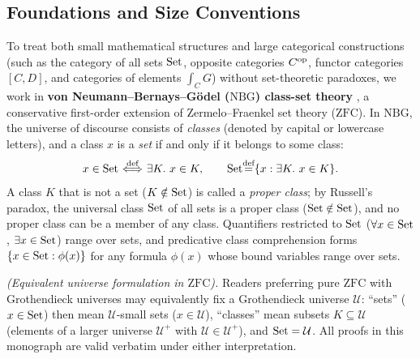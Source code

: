 \documentclass[10pt,a4paper]{article}
\begin{document}
\subsection{Foundations and Size Conventions}\label{sec:foundations}
To treat both small mathematical structures and large categorical constructions (such as the category of all sets ${\textrm{Set}}$, opposite categories $C^{\textrm{op}}$, functor categories $[C, D]$, and categories of elements $\int_C G$) without set-theoretic paradoxes, we work in \textbf{von Neumann--Bernays--G\"odel ($\mathrm{NBG}$) class-set theory} \cite{Godel1940,Bernays1958,Mendelson2015,TakeutiZaring1982}, a conservative first-order extension of Zermelo--Fraenkel set theory ($\mathrm{ZFC}$). In $\mathrm{NBG}$, the universe of discourse consists of \emph{classes} (denoted by capital or lowercase letters), and a class $x$ is a \emph{set} if and only if it belongs to some class:
$$x \in {\textrm{Set}} {\stackrel{{\textrm{def}}}{\ \Longleftrightarrow\ }} \exists K.\ x \in K, \qquad {\textrm{Set}} {\stackrel{{\textrm{def}}}{=}} \{x : \exists K.\ x \in K\}.$$
A class $K$ that is not a set ($K \notin {\textrm{Set}}$) is called a \emph{proper class}; by Russell's paradox, the universal class ${\textrm{Set}}$ of all sets is a proper class (${\textrm{Set}} \notin {\textrm{Set}}$), and no proper class can be a member of any class. Quantifiers restricted to ${\textrm{Set}}$ ($\forall x \in {\textrm{Set}}$, $\exists x \in {\textrm{Set}}$) range over sets, and predicative class comprehension forms $\{x \in {\textrm{Set}} : \phi(x)\}$ for any formula $\phi(x)$ whose bound variables range over sets.

\emph{(Equivalent universe formulation in $\mathrm{ZFC}$).} Readers preferring pure $\mathrm{ZFC}$ with Grothendieck universes \cite{SGA4,MacLane1998,Borceux1994} may equivalently fix a Grothendieck universe $\mathcal{U}$: ``sets'' ($x \in {\textrm{Set}}$) then mean $\mathcal{U}$-small sets ($x \in \mathcal{U}$), ``classes'' mean subsets $K \subseteq \mathcal{U}$ (elements of a larger universe $\mathcal{U}^+$ with $\mathcal{U} \in \mathcal{U}^+$), and ${\textrm{Set}} = \mathcal{U}$. All proofs in this monograph are valid verbatim under either interpretation.
\end{document}
